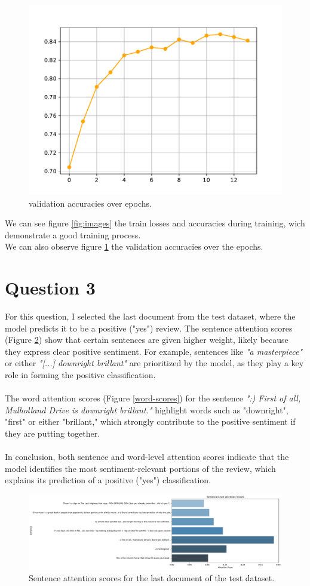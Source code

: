 \documentclass[a4paper]{article}
\begin{document}
\begin{figure}[H]
    \centering
    \includegraphics[width=.5\linewidth]{../figures/val_accs.pdf}
    \caption{validation accuracies over epochs.}
    \label{fig:third_image}
\end{figure}
We can see figure \ref{fig:images} the train losses and accuracies during training, wich demonstrate a good
training process.
\\
We can also observe figure \ref{fig:third_image} the validation accuracies over the epochs.



\section*{Question 3}
\noindent
For this question, I selected the last document from the test dataset, where the model predicts
it to be a positive ("yes") review. The sentence attention scores (Figure \ref{sentence-scores})
show that certain sentences are given higher weight, likely because they express clear positive
sentiment. For example, sentences like \textit{"a masterpiece"} or either \textit{"[...] downright brillant"}
are prioritized by the model, as they play a key role in forming the positive classification.
\\
\\
\noindent
The word attention scores (Figure \ref{word-scores}) for the sentence \textit{":) First of all, Mulholland Drive 
is downright brillant."} highlight words such
as "downright", "first" or either "brillant," which strongly contribute to the positive sentiment if they are putting together.
\\
\\
\noindent
In conclusion, both sentence and word-level attention scores indicate that the model identifies
the most sentiment-relevant portions of the review, which explains its prediction of a
positive ("yes") classification.


\begin{figure}[H]
    \centering
    \includegraphics[width=.9\linewidth]{../figures/Sentence_attention_scores.pdf}
    \caption{Sentence attention scores for the last document of the test dataset.}
    \label{sentence-scores}    
\end{figure}
\end{document}
